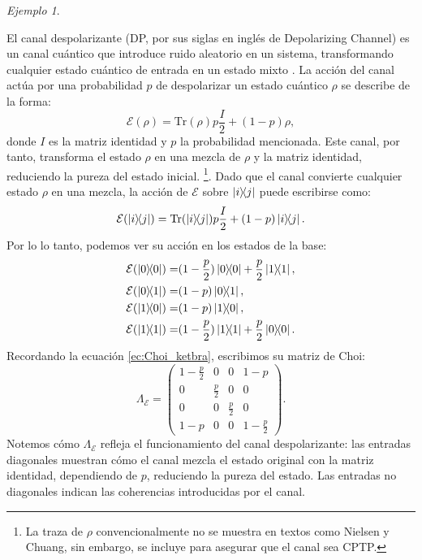 \documentclass[letterpaper,12pt]{thesisECFM}
\theoremstyle{plain}
\theoremstyle{definition}
\theoremstyle{definition}
\theoremstyle{remark}
\newcommand{\1}{\mathbb{1}}
\newtheorem{ex}{Ejemplo}[section]
\begin{document}
\begin{ex} \label{Ejemplo 1.0.1} 
\end{ex}
El canal despolarizante  (DP, por sus siglas en inglés de Depolarizing Channel)  es un canal cuántico que introduce ruido aleatorio en un sistema, transformando cualquier estado cuántico de entrada en un estado mixto \cite{nielsen_chuang_2011}. La acción del canal actúa por una probabilidad $p$ de despolarizar un estado cuántico $\rho$ se describe de la forma:
\begin{equation} \label{ec:superop_depolarizing}
\mathcal{E}(\rho) = \text{Tr}(\rho) p  \frac{I}{2}   + (1 - p)\rho ,
\end{equation}
donde $I$ es la matriz identidad y $p$ la probabilidad mencionada. Este canal, por tanto, transforma el estado $\rho$ en una mezcla de $\rho$ y la matriz identidad, reduciendo la pureza del estado inicial. \footnote{La traza de $\rho$ convencionalmente no se muestra en textos como Nielsen y Chuang, sin embargo,  se incluye para asegurar que el canal sea CPTP.}. Dado que el canal  convierte cualquier estado $\rho$ en una mezcla, la acción de $\mathcal{E}$ sobre $\ketbra{i}{j}$ puede escribirse como:
\begin{equation}
\mathcal{E}(\ketbra{i}{j}) = \text{Tr}(\ketbra{i}{j})  p \frac{I}{2}+ (1 - p) \ketbra{i}{j}.
\end{equation}
Por lo lo tanto, podemos ver su acción en los estados de la base:
\begin{alignat*}{2}
     \mathcal{E}( \ketbra{0}) = & (1 - \frac{p}{2} ) \ketbra{0} + \frac{p}{2} \ketbra{1}, \\
     \mathcal{E}( \ketbra{0}{1}) = & (1 - p ) \ketbra{0}{1},\\
      \mathcal{E}( \ketbra{1}{0}) = & (1 - p ) \ketbra{1}{0},\\
           \mathcal{E}( \ketbra{1}) = & (1 - \frac{p}{2} ) \ketbra{1} + \frac{p}{2} \ketbra{0}.
\end{alignat*}
Recordando la ecuación \ref{ec:Choi_ketbra}, escribimos su matriz de Choi:
\begin{equation}\label{ec:choi_depolarizing}
    \Lambda_\mathcal{E} = 
\begin{pmatrix}
1 - \frac{p}{2} & 0 & 0 & 1 - p \\
0 & \frac{p}{2} & 0 & 0 \\
0 & 0 & \frac{p}{2} & 0 \\
1 - p & 0 & 0 & 1 - \frac{p}{2}
\end{pmatrix}.
\end{equation}
Notemos cómo $\Lambda_{\mathcal{E}}$ refleja el funcionamiento del canal despolarizante: las entradas diagonales muestran cómo el canal mezcla el estado original con la matriz identidad, dependiendo de $p$, reduciendo la pureza del estado. Las entradas no diagonales indican las coherencias introducidas por el canal.
\end{document}
